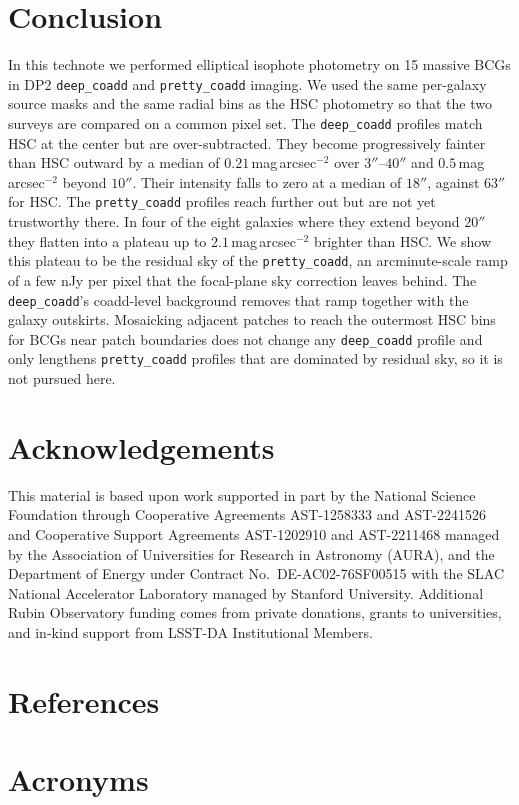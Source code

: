 \documentclass[SE,lsstdraft,authoryear,toc]{lsstdoc}
\begin{document}
\section{Conclusion}
In this technote we performed elliptical isophote photometry on 15 massive BCGs in DP2 \texttt{deep\_coadd} and \texttt{pretty\_coadd} imaging. We used the same per-galaxy source masks and the same radial bins as the HSC photometry so that the two surveys are compared on a common pixel set. The \texttt{deep\_coadd} profiles match HSC at the center but are over-subtracted. They become progressively fainter than HSC outward by a median of $0.21$\,mag\,arcsec$^{-2}$ over $3''$--$40''$ and $0.5$\,mag\,arcsec$^{-2}$ beyond $10''$. Their intensity falls to zero at a median of $18''$, against $63''$ for HSC. The \texttt{pretty\_coadd} profiles reach further out but are not yet trustworthy there. In four of the eight galaxies where they extend beyond $20''$ they flatten into a plateau up to $2.1$\,mag\,arcsec$^{-2}$ brighter than HSC. We show this plateau to be the residual sky of the \texttt{pretty\_coadd}, an arcminute-scale ramp of a few nJy per pixel that the focal-plane sky correction leaves behind. The \texttt{deep\_coadd}'s coadd-level background removes that ramp together with the galaxy outskirts. Mosaicking adjacent patches to reach the outermost HSC bins for BCGs near patch boundaries does not change any \texttt{deep\_coadd} profile and only lengthens \texttt{pretty\_coadd} profiles that are dominated by residual sky, so it is not pursued here.

\appendix

\section{Acknowledgements}

This material is based upon work supported in part by the National Science Foundation through Cooperative Agreements AST-1258333 and AST-2241526 and Cooperative Support Agreements AST-1202910 and AST-2211468 managed by the Association of Universities for Research in Astronomy (AURA), and the Department of Energy under Contract No.\ DE-AC02-76SF00515 with the SLAC National Accelerator Laboratory managed by Stanford University.
Additional Rubin Observatory funding comes from private donations, grants to universities, and in-kind support from LSST-DA Institutional Members.

\section{References} \label{sec:bib}
\renewcommand{\refname}{} %


\section{Acronyms} \label{sec:acronyms}

\end{document}
